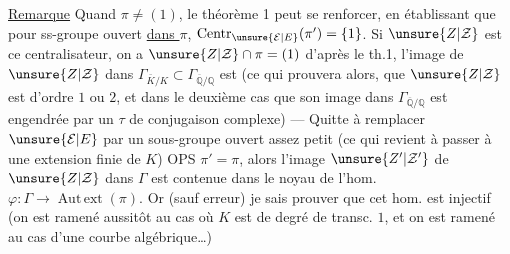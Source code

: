 \uline{Remarque} Quand $\pi\neq(1)$,  le théorème 1 peut se renforcer,  en établissant que pour  ss-groupe  ouvert \uline{dans $\pi$}, $\operatorname{Centr}_{\unsure{\mathcal E|E}}(\pi')=\{1\}$. Si $\unsure{Z|\mathcal Z}$ est ce centralisateur, on a $\unsure{Z|\mathcal Z}\cap\pi=(1)$ d'après le th.1,  l'image de $\unsure{Z|\mathcal Z}$ dans $\Gamma_{\bar K/K}\subset\Gamma_{\overline{\mathbb Q}/\mathbb Q}$ est  (ce qui prouvera  alors, que $\unsure{Z|\mathcal Z}$ est d'ordre $1$ ou $2$, et dans le deuxième cas que son image dans $\Gamma_{\overline{\mathbb Q}/\mathbb Q}$ est  engendrée par un $\tau$ de conjugaison complexe) --- Quitte à remplacer $\unsure{\mathcal E|E}$ par un sous-groupe ouvert assez petit (ce qui revient à passer à une extension finie de $K$) OPS $\pi'=\pi$, alors l'image $\unsure{Z'|\mathcal Z'}$ de $\unsure{Z|\mathcal Z}$ dans $\Gamma$ est contenue dans le noyau de l'hom. $\varphi:\Gamma\longrightarrow\operatorname{Aut\,ext}(\pi)$. Or (sauf erreur) je sais prouver que cet hom. est injectif (on est ramené aussitôt au cas où $K$ est de degré de transc. $1$, et on est ramené au cas  d'une courbe algébrique\ldots)
